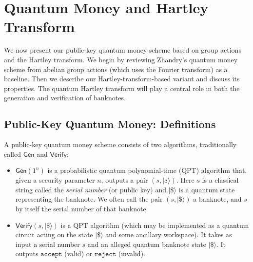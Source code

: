 \documentclass[12pt]{report}
\begin{document}





\chapter{Quantum Money and Hartley Transform}

We now present our public-key quantum money scheme based on group actions and the Hartley transform. We begin by reviewing Zhandry’s quantum money scheme from abelian group actions (which uses the Fourier transform) as a baseline. Then we describe our Hartley-transform-based variant and discuss its properties. The quantum Hartley transform will play a central role in both the generation and verification of banknotes.

\section{Public-Key Quantum Money: Definitions}
A public-key quantum money scheme consists of two algorithms, traditionally called $\mathsf{Gen}$ and $\mathsf{Verify}$:
\begin{itemize}
    \item $\mathsf{Gen}(1^n)$ is a probabilistic quantum polynomial-time (QPT) algorithm that, given a security parameter $n$, outputs a pair $(s, |\$\rangle)$. Here $s$ is a classical string called the \emph{serial number} (or public key) and $|\$\rangle$ is a quantum state representing the banknote. We often call the pair $(s, |\$\rangle)$ a banknote, and $s$ by itself the serial number of that banknote.
    \item $\mathsf{Verify}(s, |\$\rangle)$ is a QPT algorithm (which may be implemented as a quantum circuit acting on the state $|\$\rangle$ and some ancillary workspace). It takes as input a serial number $s$ and an alleged quantum banknote state $|\$\rangle$. It outputs $\mathtt{accept}$ (valid) or $\mathtt{reject}$ (invalid).
\end{itemize}
\end{document}
